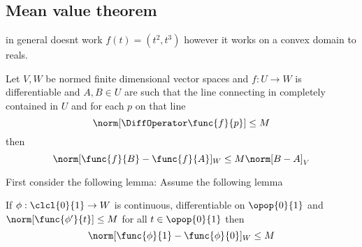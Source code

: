\subsection{Mean value theorem}
in general doesnt work \(f(t) = (t^2,t^3)\) however it works on a convex domain to reals.

\begin{theorem}
    Let \(V,W\) be normed finite dimensional vector spaces and \(f: U \to W\) is differentiable and \(A,B \in U\) are such that the line connecting in completely contained in \(U\) and for each \(p\) on that line
    \begin{equation*}
        \norm[\DiffOperator \func{f}{p}] \leq M
    \end{equation*}
    then
    \begin{equation*}
        \norm[\func{f}{B} - \func{f}{A}]_W \leq M \norm[B - A]_V
    \end{equation*}
\end{theorem}
First consider the following lemma:
Assume the following lemma
\begin{lemma} \label{lm:MeanValueTheoremLemma}
    If \(\phi: \clcl{0}{1} \to W\) is continuous, differentiable on \(\opop{0}{1}\) and \(\norm[\func{\phi'}{t}] \leq M\) for all \(t \in \opop{0}{1}\) then
    \begin{equation*}
        \norm[\func{\phi}{1} - \func{\phi}{0}]_W \leq M
    \end{equation*}
\end{lemma}

